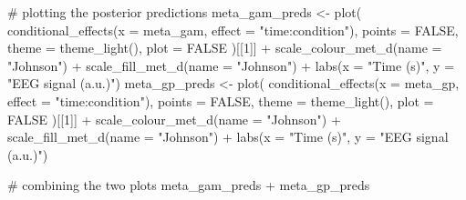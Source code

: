 \documentclass[
  doc,
  floatsintext,
  longtable,
  a4paper,
  nolmodern,
  notxfonts,
  notimes,
  colorlinks=true,linkcolor=blue,citecolor=blue,urlcolor=blue]{apa7}
\newenvironment{Shaded}{\begin{snugshade}}{\end{snugshade}}
\newcommand{\AttributeTok}[1]{\textcolor[rgb]{0.40,0.45,0.13}{#1}}
\newcommand{\CommentTok}[1]{\textcolor[rgb]{0.37,0.37,0.37}{#1}}
\newcommand{\ConstantTok}[1]{\textcolor[rgb]{0.56,0.35,0.01}{#1}}
\newcommand{\DecValTok}[1]{\textcolor[rgb]{0.68,0.00,0.00}{#1}}
\newcommand{\FunctionTok}[1]{\textcolor[rgb]{0.28,0.35,0.67}{#1}}
\newcommand{\NormalTok}[1]{\textcolor[rgb]{0.00,0.23,0.31}{#1}}
\newcommand{\OtherTok}[1]{\textcolor[rgb]{0.00,0.23,0.31}{#1}}
\newcommand{\SpecialCharTok}[1]{\textcolor[rgb]{0.37,0.37,0.37}{#1}}
\newcommand{\StringTok}[1]{\textcolor[rgb]{0.13,0.47,0.30}{#1}}
\begin{document}
\begin{Shaded}
\begin{Highlighting}[]
\CommentTok{\# plotting the posterior predictions}
\NormalTok{meta\_gam\_preds }\OtherTok{\textless{}{-}} \FunctionTok{plot}\NormalTok{(}
    \FunctionTok{conditional\_effects}\NormalTok{(}\AttributeTok{x =}\NormalTok{ meta\_gam, }\AttributeTok{effect =} \StringTok{"time:condition"}\NormalTok{),}
    \AttributeTok{points =} \ConstantTok{FALSE}\NormalTok{, }\AttributeTok{theme =} \FunctionTok{theme\_light}\NormalTok{(), }\AttributeTok{plot =} \ConstantTok{FALSE}
\NormalTok{    )[[}\DecValTok{1}\NormalTok{]] }\SpecialCharTok{+}
    \FunctionTok{scale\_colour\_met\_d}\NormalTok{(}\AttributeTok{name =} \StringTok{"Johnson"}\NormalTok{) }\SpecialCharTok{+}
    \FunctionTok{scale\_fill\_met\_d}\NormalTok{(}\AttributeTok{name =} \StringTok{"Johnson"}\NormalTok{) }\SpecialCharTok{+}
    \FunctionTok{labs}\NormalTok{(}\AttributeTok{x =} \StringTok{"Time (s)"}\NormalTok{, }\AttributeTok{y =} \StringTok{"EEG signal (a.u.)"}\NormalTok{)}
\NormalTok{meta\_gp\_preds }\OtherTok{\textless{}{-}} \FunctionTok{plot}\NormalTok{(}
    \FunctionTok{conditional\_effects}\NormalTok{(}\AttributeTok{x =}\NormalTok{ meta\_gp, }\AttributeTok{effect =} \StringTok{"time:condition"}\NormalTok{),}
    \AttributeTok{points =} \ConstantTok{FALSE}\NormalTok{, }\AttributeTok{theme =} \FunctionTok{theme\_light}\NormalTok{(), }\AttributeTok{plot =} \ConstantTok{FALSE}
\NormalTok{    )[[}\DecValTok{1}\NormalTok{]] }\SpecialCharTok{+}
    \FunctionTok{scale\_colour\_met\_d}\NormalTok{(}\AttributeTok{name =} \StringTok{"Johnson"}\NormalTok{) }\SpecialCharTok{+}
    \FunctionTok{scale\_fill\_met\_d}\NormalTok{(}\AttributeTok{name =} \StringTok{"Johnson"}\NormalTok{) }\SpecialCharTok{+}
    \FunctionTok{labs}\NormalTok{(}\AttributeTok{x =} \StringTok{"Time (s)"}\NormalTok{, }\AttributeTok{y =} \StringTok{"EEG signal (a.u.)"}\NormalTok{)}

\CommentTok{\# combining the two plots}
\NormalTok{meta\_gam\_preds }\SpecialCharTok{+}\NormalTok{ meta\_gp\_preds}
\end{Highlighting}
\end{Shaded}
\end{document}
